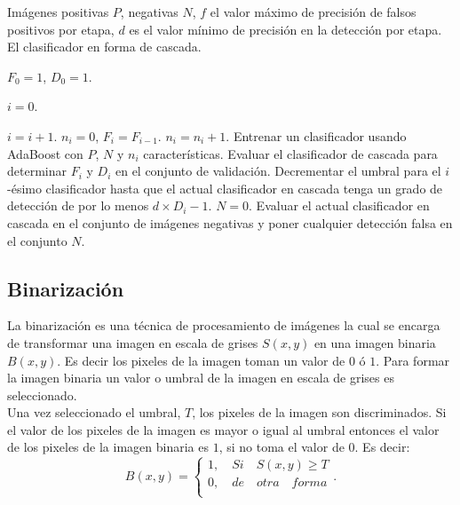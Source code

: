 \begin{algorithm}[h!]
\begin{algorithmic}[2]

\REQUIRE Imágenes positivas $P$, negativas $N$, $f$ el valor máximo de precisión de falsos positivos por etapa, $d$ es el valor mínimo de precisión en la detección por etapa. 
\ENSURE El clasificador en forma de cascada.  

\STATE  $F_0 = 1$, $D_0=1.$

\STATE  $i=0.$ 

	\STATE $i=i+1.$
	\STATE $n_i=0$, $F_i=F_{i-1}.$
		\STATE $n_i = n_i +1.$ 
		\STATE Entrenar un clasificador usando AdaBoost con $P$, $N$ y $n_i$ características. 
		\STATE Evaluar el clasificador de cascada para determinar $F_i$ y $D_i$ en el conjunto de validación. 
		\STATE Decrementar el umbral para el $i$-ésimo clasificador hasta que el actual clasificador en cascada tenga un grado 			de detección de por lo menos $d \times D_i-1$.
	\ENDWHILE
	\STATE $N=0.$ 
		\STATE Evaluar el actual clasificador en cascada en el conjunto de imágenes negativas y poner cualquier detección 				falsa en el conjunto $N$.
	\ENDIF

\ENDWHILE    
\caption{}\label{alg:Cascade} 
\end{algorithmic}
\end{algorithm} 


\subsection{Binarización}\label{subsec:Binarization} 

La binarización es una técnica de procesamiento de imágenes la cual se encarga de transformar una imagen en escala de grises $S(x,y)$ en una imagen binaria $B(x,y)$. Es decir los pixeles de la imagen toman un valor de $0$ ó $1$. Para formar la imagen binaria un valor o umbral de la imagen en escala de grises es seleccionado. \\ 
Una vez seleccionado el umbral, $T$, los pixeles de la imagen son discriminados. Si el valor de los pixeles de la imagen es mayor o igual al umbral entonces el valor de los pixeles de la imagen binaria es $1$, si no toma el valor de $0$. Es decir: 
\begin{equation}
B(x,y)=
\begin{cases}   
1, \quad Si \quad S(x,y)\geq T \\
0, \quad de \quad otra \quad forma\\
\end{cases}.
\end{equation}


